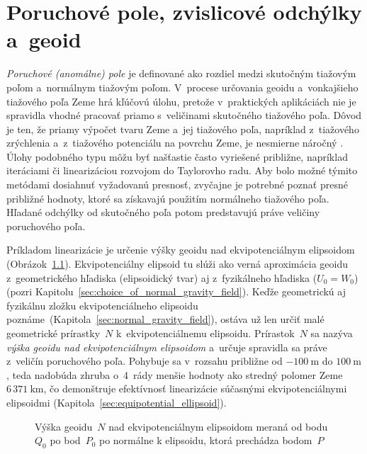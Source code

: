 \documentclass[a4paper,12pt]{book}
\begin{document}

\chapter{Poruchové pole, zvislicové odchýlky a~geoid}
\label{sec:disturbing_field_geoid_deflections}

\emph{Poruchové (anomálne) pole} je definované ako rozdiel medzi skutočným 
tiažovým poľom a~normálnym tiažovým poľom.  V~procese určovania geoidu 
a~vonkajšieho tiažového poľa Zeme hrá kľúčovú úlohu, pretože v~praktických 
aplikáciách nie je spravidla vhodné pracovať priamo s~veličinami skutočného 
tiažového poľa.  Dôvod je ten, že priamy výpočet tvaru Zeme a~jej tiažového 
poľa, napríklad z~tiažového zrýchlenia a~z~tiažového potenciálu na povrchu 
Zeme, je nesmierne náročný \parencite[pozri 
napríklad][]{Hormander1976,SansoGeodeticBoundaryValueProblem}.  Úlohy podobného 
typu môžu byť našťastie často vyriešené približne, napríklad iteráciami či 
linearizáciou rozvojom do Taylorovho radu.  Aby bolo možné týmito metódami 
dosiahnuť vyžadovanú presnosť, zvyčajne je potrebné poznať presné približné 
hodnoty, ktoré sa získavajú použitím normálneho tiažového poľa.  Hľadané 
odchýlky od skutočného poľa potom predstavujú práve veličiny poruchového poľa.

Príkladom linearizácie je určenie výšky geoidu nad ekvipotenciálnym elipsoidom 
(Obrázok~\ref{fig:geoid}).  Ekvipotenciálny elipsoid tu slúži ako verná 
aproximácia geoidu z~geometrického hľadiska (elipsoidický tvar) aj 
z~fyzikálneho hľadiska ($U_0 = W_0$) (pozri 
Kapitolu~\ref{sec:choice_of_normal_gravity_field}).  Keďže geometrickú aj 
fyzikálnu zložku ekvipotenciálneho elipsoidu 
poznáme~(Kapitola~\ref{sec:normal_gravity_field}), ostáva už len určiť malé 
geometrické prírastky~$N$ k~ekvipotenciálnemu elipsoidu.  Prírastok~$N$ sa 
nazýva \emph{výška geoidu nad ekvipotenciálnym elipsoidom} a~určuje spravidla 
sa práve z~veličín poruchového poľa.  Pohybuje sa v~rozsahu približne od $-100\ 
\mathrm{m}$ do $100\ \mathrm{m}$, teda nadobúda zhruba o~4~rády menšie hodnoty 
ako stredný polomer Zeme~$6\, 371\ \mathrm{km}$, čo demonštruje efektívnosť 
linearizácie súčasnými ekvipotenciálnymi elipsoidmi 
(Kapitola~\ref{sec:equipotential_ellipsoid}).

\begin{figure}[bt]
\centering

\caption{Výška geoidu~$N$ nad ekvipotenciálnym elipsoidom meraná od bodu~$Q_0$ 
po bod~$P_0$ po normálne k elipsoidu, ktorá prechádza bodom~$P$}
\label{fig:geoid}
\end{figure}
\end{document}

